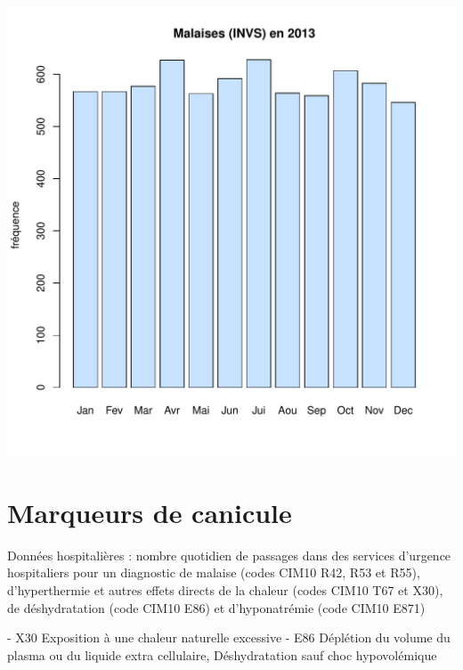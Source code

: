 \documentclass[12pt,english,french,twoside]{book}\usepackage[]{graphicx}\usepackage[]{color}
\makeatletter
\def\maxwidth{ %
  \ifdim\Gin@nat@width>\linewidth
    \linewidth
  \else
    \Gin@nat@width
  \fi
}
\newenvironment{knitrout}{}{} %
\makeatother
\begin{document}
\begin{knitrout}
\color{fgcolor}
\includegraphics[width=\maxwidth]{figure/malaises_invs-1} 

\end{knitrout}

\section{Marqueurs de canicule}

Données hospitalières : nombre quotidien de passages dans des services d'urgence hospitaliers pour un diagnostic de malaise (codes CIM10 R42, R53 et R55), d'hyperthermie et autres effets directs de la chaleur (codes CIM10 T67 et X30), de déshydratation (code CIM10 E86) et d'hyponatrémie (code CIM10 E871)

- X30  Exposition à une chaleur naturelle excessive
- E86  Déplétion du volume du plasma ou du liquide extra cellulaire, Déshydratation sauf choc hypovolémique
\end{document}
